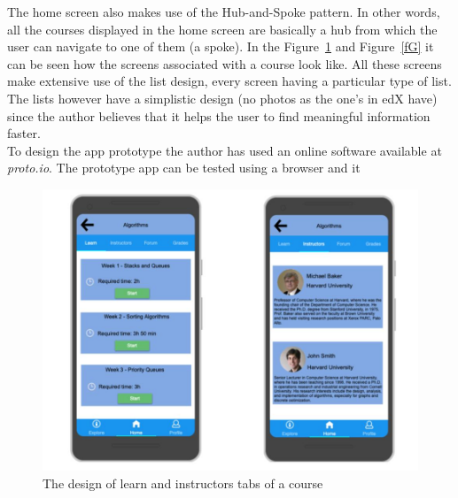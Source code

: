 \documentclass[version=last,fontsize=13pt]{scrartcl}
\begin{document}
	The home screen also makes use of the Hub-and-Spoke pattern. In other words, all the courses displayed in the home screen are basically a  hub from which the user can navigate to one of them (a spoke). In the Figure~\ref{lI} and Figure~\ref{fG} it can be seen how the screens associated with a course look like. All these screens make extensive use of the list design, every screen having a particular type of list. The lists however have a simplistic design (no photos as the one's in edX have) since the author believes that it helps the user to find meaningful information faster.\\

	To design the app prototype the author has used an online software available at \textit{proto.io}. The prototype app can be tested using a browser and it 

		\begin{figure}[H]

			\centering	
			\includegraphics[scale = 0.45]{./imgs/prototype/learn+instr}
			\caption{The design of learn and instructors tabs of a course}
			\label{lI}

		\end{figure}
\end{document}
